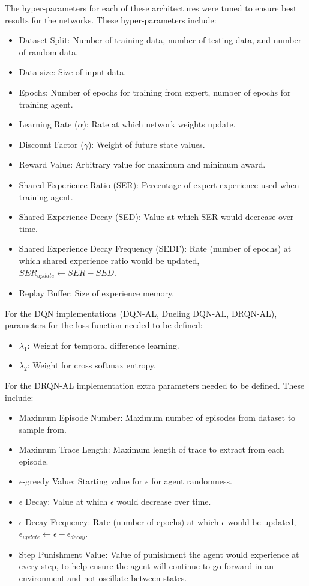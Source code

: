 \documentclass[12pt,american]{report}
\begin{document}
The hyper-parameters for each of these architectures were tuned to ensure best results for the networks.  These hyper-parameters include:
\begin{itemize}
  \item Dataset Split: Number of training data, number of testing data, and number of random data.
  \item Data size: Size of input data.
  \item Epochs: Number of epochs for training from expert, number of epochs for training agent.
  \item Learning Rate ($\alpha$): Rate at which network weights update.
  \item Discount Factor ($\gamma$): Weight of future state values.
  \item Reward Value: Arbitrary value for maximum and minimum award.
  \item Shared Experience Ratio (SER): Percentage of expert experience used when training agent.
  \item Shared Experience Decay (SED): Value at which SER would decrease over time.
  \item Shared Experience Decay Frequency (SEDF): Rate (number of epochs) at which shared experience ratio would be updated, \\$SER_{update} \leftarrow SER - SED$.
  \item Replay Buffer: Size of experience memory.
\end{itemize}
For the DQN implementations (DQN-AL, Dueling DQN-AL, DRQN-AL), parameters for the loss function needed to be defined:
\begin{itemize}
	\item $\lambda_{1}$: Weight for temporal difference learning.
	\item $\lambda_{2}$: Weight for cross softmax entropy.
\end{itemize}
For the DRQN-AL implementation extra parameters needed to be defined.  These include:
\begin{itemize}
	\item Maximum Episode Number: Maximum number of episodes from dataset to sample from.
	\item Maximum Trace Length: Maximum length of trace to extract from each episode.
	\item $\epsilon$-greedy Value: Starting value for $\epsilon$ for agent randomness.
	\item $\epsilon$ Decay: Value at which $\epsilon$ would decrease over time.
	\item $\epsilon$ Decay Frequency: Rate (number of epochs) at which $\epsilon$ would be updated,\\ $\epsilon_{update} \leftarrow \epsilon - \epsilon_{decay}$.
	\item Step Punishment Value: Value of punishment the agent would experience at every step, to help ensure the agent will continue to go forward in an environment and not oscillate between states.
\end{itemize}
\end{document}
